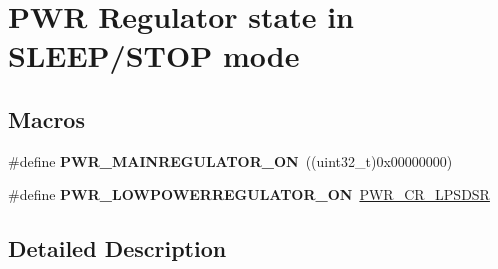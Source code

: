 \hypertarget{group___p_w_r___regulator__state__in___s_l_e_e_p___s_t_o_p__mode}{\section{P\-W\-R Regulator state in S\-L\-E\-E\-P/\-S\-T\-O\-P mode}
\label{group___p_w_r___regulator__state__in___s_l_e_e_p___s_t_o_p__mode}
}
\subsection*{Macros}
\begin{DoxyCompactItemize}
\item 
\hypertarget{group___p_w_r___regulator__state__in___s_l_e_e_p___s_t_o_p__mode_ga1d5b4e1482184286e28c16162f530039}{\#define {\bfseries P\-W\-R\-\_\-\-M\-A\-I\-N\-R\-E\-G\-U\-L\-A\-T\-O\-R\-\_\-\-O\-N}~((uint32\-\_\-t)0x00000000)}\label{group___p_w_r___regulator__state__in___s_l_e_e_p___s_t_o_p__mode_ga1d5b4e1482184286e28c16162f530039}

\item 
\hypertarget{group___p_w_r___regulator__state__in___s_l_e_e_p___s_t_o_p__mode_gab9922a15f8414818d736d5e7fcace963}{\#define {\bfseries P\-W\-R\-\_\-\-L\-O\-W\-P\-O\-W\-E\-R\-R\-E\-G\-U\-L\-A\-T\-O\-R\-\_\-\-O\-N}~\hyperlink{group___peripheral___registers___bits___definition_ga4e3d6a1e77ba526a2bc43343916f0e79}{P\-W\-R\-\_\-\-C\-R\-\_\-\-L\-P\-S\-D\-S\-R}}\label{group___p_w_r___regulator__state__in___s_l_e_e_p___s_t_o_p__mode_gab9922a15f8414818d736d5e7fcace963}

\end{DoxyCompactItemize}


\subsection{Detailed Description}
